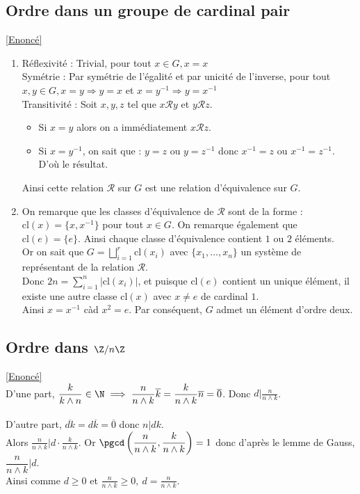 \documentclass[8pt]{book}
\begin{document}
	\subsection{Ordre dans un groupe de cardinal pair }
	\label{Ordre dans un groupe de cardinal pair corrigé}
	\textcolor{blue}{\hyperref[Ordre dans un groupe de cardinal pair]{[Enoncé]}}\\
	\begin{enumerate}
		\item
		Réflexivité : Trivial, pour tout $x\in G, x=x$\\
		Symétrie : Par symétrie de l'égalité et par unicité de l'inverse, pour tout $x,y \in G, x=y \Rightarrow y=x $ et $ x=y^{-1} \Rightarrow y=x^{-1}$\\
		Transitivité : Soit $x,y,z$ tel que $x\mathcal R y$ et $y\mathcal{R} z$.
		\begin{itemize}
			\item Si $x=y$ alors on a immédiatement $x\mathcal R z$.
			\item Si $x=y^{-1}$, on sait que : $y=z$ ou $y=z^{-1}$ donc $x^{-1}=z$ ou $x^{-1}=z^{-1}$. D'où le résultat. 
		\end{itemize}
		Ainsi cette relation $\mathcal R$ sur $G$ est une relation d'équivalence sur $G$.
		\item On remarque que les classes d'équivalence de $\mathcal R$ sont de la forme : $\text{cl}(x)=\{x,x^{-1}\}$ pour tout $x\in G$. On remarque également que $\text{cl}(e)=\{e\}$. Ainsi chaque classe d'équivalence contient $1$ ou $2$ éléments.\\
		Or on sait que $G=\displaystyle\bigsqcup_{i=1}^r\text{cl}(x_i)$ avec $\{x_1,\dots,x_n\}$ un système de représentant de la relation $\mathcal R$.\\
		Donc $2n=\displaystyle\sum_{i=1}^n|\text{cl}(x_i)|$, et puisque $\text{cl}(e)$ contient un unique élément, il existe une autre classe $\text{cl}(x)$ avec $x\ne e$ de cardinal $1$.\\
		Ainsi $x=x^{-1}$ càd $x^2=e$.
		Par conséquent, $G$ admet un élément d'ordre deux.
	\end{enumerate}
	
	\subsection{Ordre dans $\Z/n\Z$ }
	\label{Ordre dans Z/nZ corrigé}
	\textcolor{blue}{\hyperref[Ordre dans Z/nZ]{[Enoncé]}}\\
	D'une part, $\displaystyle\frac{k}{k\wedge n}\in \N\implies\frac{n}{n\wedge k}\overline k=\frac{k}{n\wedge k}\overline n=\overline 0$. Donc $d|\displaystyle\frac{n}{n\wedge k}$.\\\\
	D'autre part, $\overline{dk}=d\overline k=\overline 0$ donc $n|dk$.\\
	Alors $\displaystyle\frac{n}{n\wedge k}|d\cdot\frac{k}{n\wedge k}$. Or $\pgcd\left(\displaystyle\frac{n}{n\land k},\frac{k}{n\wedge k}\right)=1$ donc d'après le lemme de Gauss, $\dfrac{n}{n\wedge k}|d$.\\
	Ainsi comme $d\geq 0$ et $\displaystyle\frac{n}{n\wedge k}\geq 0,\ d=\frac{n}{n\wedge k}$.
	
\end{document}

